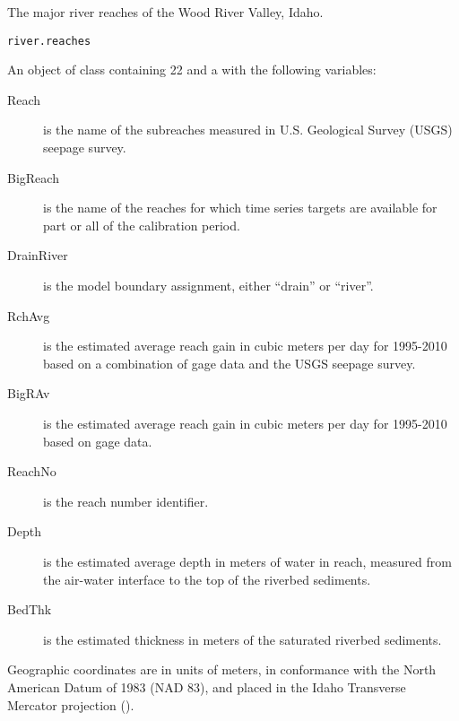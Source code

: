 \documentclass[a4paper]{book}
\begin{document}
%
\begin{Examples}
\end{Examples}
%
\begin{Description}\relax
The major river reaches of the Wood River Valley, Idaho.
\end{Description}
%
\begin{Usage}
\begin{verbatim}
river.reaches
\end{verbatim}
\end{Usage}
%
\begin{Format}
An object of  class containing 22  and a  with the following variables:
\begin{description}

\item[Reach] is the name of the subreaches measured in U.S. Geological Survey (USGS) seepage survey.
\item[BigReach] is the name of the reaches for which time series targets are available for part or all of the calibration period.
\item[DrainRiver] is the model boundary assignment, either ``drain'' or ``river''.
\item[RchAvg] is the estimated average reach gain in cubic meters per day for 1995-2010 based on a combination of gage data and the USGS seepage survey.
\item[BigRAv] is the estimated average reach gain in cubic meters per day for 1995-2010 based on gage data.
\item[ReachNo] is the reach number identifier.
\item[Depth] is the estimated average depth in meters of water in reach, measured from the air-water interface to the top of the riverbed sediments.
\item[BedThk] is the estimated thickness in meters of the saturated riverbed sediments.

\end{description}

Geographic coordinates are in units of meters, in conformance with the North American Datum of 1983 (NAD 83), and placed in the
Idaho Transverse Mercator projection ().
\end{Format}
\end{document}
